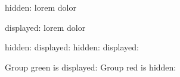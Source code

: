


{}

\clozehide

hidden:  lorem  dolor

\clozeshow

displayed: lorem  dolor

\clozehide hidden: 
\clozeshow displayed: 
\clozehide hidden: 
\clozeshow displayed: 


\clozeshow

\clozehide[red]

Group green is displayed: 
Group red is hidden: 

\bye
